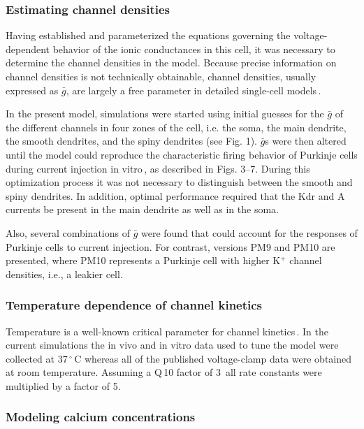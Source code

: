 \documentclass[12pt]{article}
\begin{document}
\subsubsection*{Estimating channel densities}

Having established and parameterized the equations governing the
voltage-dependent behavior of the ionic conductances in this
cell, it was necessary to determine the channel densities in the
model. Because precise information on channel densities is not
technically obtainable, channel densities, usually expressed as $\bar g$,
are largely a free parameter in detailed single-cell models\,\cite{S:1993dz, L:1992kl, W:1991qa, Traub-R-D:1991mi}.

In the present model, simulations were started using initial
guesses for the $\bar g$ of the different channels in four zones of the cell,
i.e. the soma, the main dendrite, the smooth dendrites, and the
spiny dendrites (see Fig. 1). $\bar g$s were then altered until the model
could reproduce the characteristic firing behavior of Purkinje cells
during current injection in vitro\,\cite{R:1980ly, R:1980pi},
as described in Figs. 3--7. During this optimization
process it was not necessary to distinguish between
the smooth and spiny dendrites. In addition, optimal performance
required that the Kdr and A currents be present in the
main dendrite as well as in the soma.

Also, several combinations of $\bar g$ were found that could account for
the responses of Purkinje cells to current injection. For contrast,
versions PM9 and PM10 are presented, where PM10 represents
a Purkinje cell with higher K$^+$ channel densities, i.e., a leakier
cell.

\subsubsection*{Temperature dependence of channel kinetics}

Temperature is a well-known critical parameter for channel kinetics\,\cite{B:1991zr}.
In the current simulations the in vivo and in vitro data
used to tune the model were collected at 37\,$^\circ$\,C whereas all of the
published voltage-clamp data were obtained at room temperature.
Assuming a Q\,10 factor of 3\,\cite{L:1952fv} all rate constants were multiplied by a factor of 5.

\subsubsection*{Modeling calcium concentrations}
\end{document}

